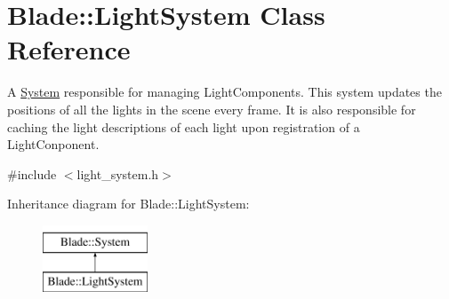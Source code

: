 \hypertarget{class_blade_1_1_light_system}{}\section{Blade\+:\+:Light\+System Class Reference}
\label{class_blade_1_1_light_system}


A \hyperlink{class_blade_1_1_system}{System} responsible for managing Light\+Components. This system updates the positions of all the lights in the scene every frame. It is also responsible for caching the light descriptions of each light upon registration of a Light\+Conponent.  




{\ttfamily \#include $<$light\+\_\+system.\+h$>$}

Inheritance diagram for Blade\+:\+:Light\+System\+:\begin{figure}[H]
\begin{center}
\leavevmode
\includegraphics[height=2.000000cm]{class_blade_1_1_light_system}
\end{center}
\end{figure}
